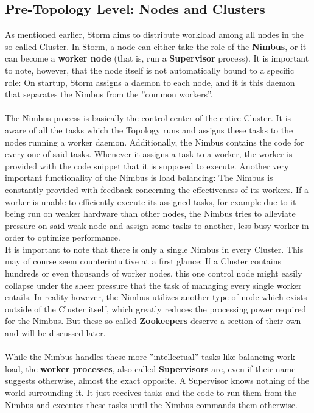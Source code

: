 \documentclass[12pt,a4paper]{article}
\begin{document}
\subsection{Pre-Topology Level: Nodes and Clusters}

As mentioned earlier, Storm aims to distribute workload among all nodes in the so-called Cluster. In Storm, a node can either take the role of the \textbf{Nimbus}, or it can become a \textbf{worker node} (that is, run a \textbf{Supervisor} process). It is important to note, however, that the node itself is not automatically bound to a specific role: On startup, Storm assigns a daemon to each node, and it is this daemon that separates the Nimbus from the ''common workers''.\\\\

The Nimbus process is basically the control center of the entire Cluster. It is aware of all the tasks which the Topology runs and assigns these tasks to the nodes running a worker daemon. Additionally, the Nimbus contains the code for every one of said tasks. Whenever it assigns a task to a worker, the worker is provided with the code snippet that it is supposed to execute. Another very important functionality of the Nimbus is load balancing: The Nimbus is constantly provided with feedback concerning the effectiveness of its workers. If a worker is unable to efficiently execute its assigned tasks, for example due to it being run on weaker hardware than other nodes, the Nimbus tries to alleviate pressure on said weak node and assign some tasks to another, less busy worker in order to optimize performance.\\

It is important to note that there is only a single Nimbus in every Cluster. This may of course seem counterintuitive at a first glance: If a Cluster contains hundreds or even thousands of worker nodes, this one control node might easily collapse under the sheer pressure that the task of managing every single worker entails. In reality however, the Nimbus utilizes another type of node which exists outside of the Cluster itself, which greatly reduces the processing power required for the Nimbus. But these so-called \textbf{Zookeepers} deserve a section of their own and will be discussed later.\\\\

While the Nimbus handles these more ''intellectual'' tasks like balancing work load, the \textbf{worker processes}, also called \textbf{Supervisors} are, even if their name suggests otherwise, almost the exact opposite. A Supervisor knows nothing of the world surrounding it. It just receives tasks and the code to run them from the Nimbus and executes these tasks until the Nimbus commands them otherwise.\\
\end{document}
